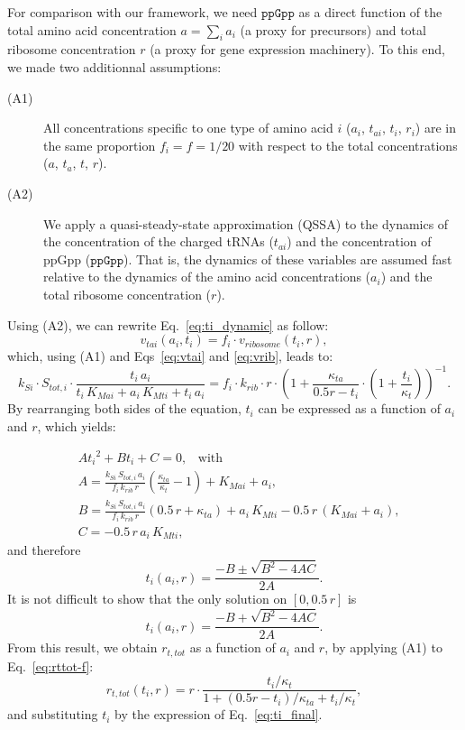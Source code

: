 For comparison with our framework, we need $\texttt{ppGpp}$ as a direct function of the total amino acid concentration $a = \sum_i a_i$ (a proxy for precursors) and total ribosome concentration $r$ (a proxy for gene expression machinery).
To this end, we made two additionnal assumptions:
\begin{description}
\item[(A1)] All concentrations specific to one type of amino acid $i$ ($a_i$, $t_{ai}$, $t_{i}$, $r_i$) are in the same proportion $f_i = f = 1/20$ with respect to the total concentrations ($a$, $t_{a}$, $t$, $r$).
\item[(A2)] We apply a quasi-steady-state approximation (QSSA) to the dynamics of the concentration of the charged tRNAs ($t_{ai}$) and the concentration of ppGpp ($\texttt{ppGpp}$).
That is, the dynamics of these variables are assumed fast relative to the dynamics of the amino acid concentrations ($a_i$) and the total ribosome concentration ($r$).
\end{description}
Using (A2), we can rewrite Eq.~\ref{eq:ti_dynamic} as follow:
\begin{equation}\label{eq:vtai_vrib}
v_{tai}(a_i, t_{i}) = f_i \cdot v_{ribosome}(t_i,r),
\end{equation}
which, using (A1) and Eqs~\ref{eq:vtai} and \ref{eq:vrib}, leads to:
\begin{equation}
\label{eq:vtai_vrib_without_sum}
k_{Si} \cdot S_{tot,i} \cdot \frac{t_i\, a_i}{t_i\, K_{Mai} + a_i\, K_{Mti} + t_i\, a_i}
= f_i \cdot k_{rib} \cdot r \cdot
  \left(1 + \frac{\kappa_{ta}}{0.5 r - t_i} \cdot \left( 1 + \frac{t_i}{\kappa_t} \right)  \right)^{-1}.
\end{equation}
By rearranging both sides of the equation, $t_i$ can be expressed as a function of $a_i$ and $r$, which yields:

\begin{equation}
\begin{alignedat}{2}
&A {t_i}^2 + B t_i + C = 0, \;\;\; \text{with}\\
&A = \frac{k_{Si} \,S_{tot,i} \,a_i}{f_i\, k_{rib} \,r} \left( \frac{\kappa_{ta}}{\kappa_t} - 1\right) + K_{Mai} + a_i,\\
&B = \frac{k_{Si} \,S_{tot,i} \,a_i}{f_i \,k_{rib} \,r} (0.5\,r+\kappa_{ta}) + a_i \,K_{Mti} - 0.5\,r\,(K_{Mai} + a_i),\\
&C = - 0.5 \,r \,a_i \,K_{Mti},
\end{alignedat}
\end{equation}
and therefore
\[
t_i (a_i, r) = \frac{-B \pm \sqrt{B^2 - 4AC}}{2A}.
\]
It is not difficult to show that the only solution on $[0, 0.5\,r]$ is
\begin{equation}
\label{eq:ti_final}
t_i (a_i, r) = \frac{-B + \sqrt{B^2 - 4AC}}{2A}.
\end{equation}
From this result, we obtain $r_{t,tot}$ as a function of $a_i$ and $r$, by applying (A1) to Eq.~\ref{eq:rttot-f}:
\begin{equation}
\label{eq:rttot-f_without_sum}
r_{t,tot}(t_i, r) = r \cdot \frac{t_i/\kappa_{t}}{1+(0.5 r-t_i)/\kappa_{ta}+t_i/\kappa_{t}},
\end{equation}
and substituting $t_i$ by the expression of Eq.~\ref{eq:ti_final}.

